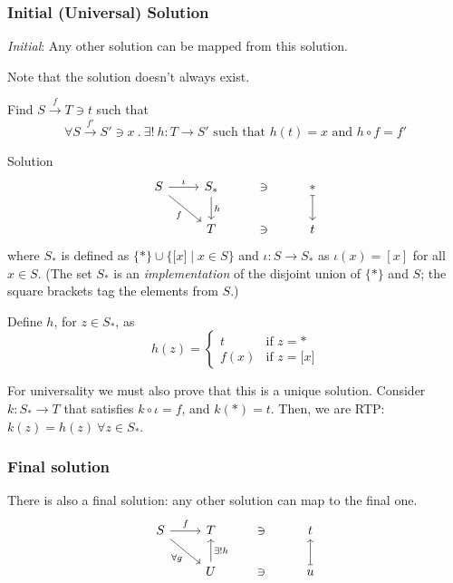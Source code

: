 \documentclass[a4paper, 12pt]{article}
\theoremstyle{definition}
\newcommand{\setof}[1]{ \{ #1 \} }
\newcommand{\bigsetof}[1]{ \big\{ #1 \big\} }
\newcommand{\suchthat}{\mid}
\newcommand{\union}{\cup}
\begin{document}
\subsubsection*{Initial (Universal) Solution}

\emph{Initial}: Any other solution can be mapped from this solution.

Note that the solution doesn't always exist.

Find $S \overset{f}{\rightarrow} T \ni t$ such that
$$
\forall S \overset{f'}{\rightarrow} S' \ni x \ .\ 
\exists!\ h : T \rightarrow S' \text{ such that }
h(t) = x \text{ and }
h \circ f = f'
$$

Solution
$$
    \begin{tikzcd}
        S \arrow[r, "\iota"]
          \arrow[dr, swap, "f"]
          & 
        S_{\ast} 
        \arrow[d, "h"]
        & \ni & \ast
        \arrow[d, mapsto]
          \\
        {}
          &
        T & \ni & t
    \end{tikzcd}
$$
where $S_\ast$ is defined as 
$\setof{ \ast } \union \bigsetof{ \lbrack x\rbrack \suchthat x \in S }$
and $\iota: S \to S_\ast$ as $\iota(x)=[x]$ for all $x\in S$.  
%
(The set $S_\ast$ is an \emph{implementation} of the disjoint union of
$\setof{*}$ and $S$; the square brackets tag the elements from $S$.)

Define $h$, for $z\in S_\ast$, as
\begin{equation*}
    h(z) = \begin{cases}
        t & \text{if } z = \ast\\
        f(x) & \text{if } z = \lbrack x \rbrack 
    \end{cases}
\end{equation*}

For universality we must also prove that this is a unique solution.
Consider $k:S_\ast\to T$ that satisfies $k \circ \iota = f$, and 
$k(\ast) = t$. Then, we are RTP: $k(z) = h(z)\ \forall z \in S_\ast$.

\subsubsection*{Final solution}

There is also a final solution: any other solution can map to the final one.
$$
    \begin{tikzcd}
        S \arrow[r, "f"]
          \arrow[dr, swap, "\forall g"]
          & 
        T & \ni & t
          \\
        {}
          &
          U 
          \arrow[u, swap, "\exists! h"]
          & \ni & u
          \arrow[u, swap, mapsto]
    \end{tikzcd}
$$
\end{document}
